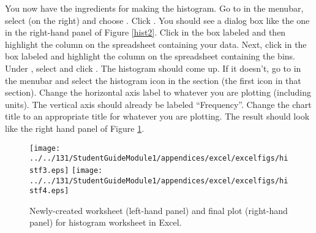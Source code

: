 You now have the ingredients for making the histogram.
Go to  in the menubar, select  (on the right) and 
choose . Click .
You should see a dialog box like the one in the right-hand panel of  Figure \ref{hist2}.
Click in the box labeled  and then highlight the column on the spreadsheet containing your data.
Next, click in the box labeled  and highlight the column on the spreadsheet containing the bins.
Under , select  and click . The histogram should come up. 
If it doesn't, go to  in the menubar and select 
the histogram icon in the  section (the first icon in that section).
Change the horizontal axis label to whatever you are plotting (including units). The vertical axis should already be labeled ``Frequency''.
Change the chart title to an appropriate title for whatever you are plotting. 
The result should look like the right hand panel of Figure \ref{hist5}.
\begin{figure}[b!]
\begin{center}
\texttt{[image: ../../131/StudentGuideModule1/appendices/excel/excelfigs/histf3.eps]}
\hspace{0.4in}
\texttt{[image: ../../131/StudentGuideModule1/appendices/excel/excelfigs/histf4.eps]}
\caption{Newly-created worksheet (left-hand panel) and final plot (right-hand panel) for  histogram worksheet in Excel.}\label{hist5}
\end{center}
\end{figure}

